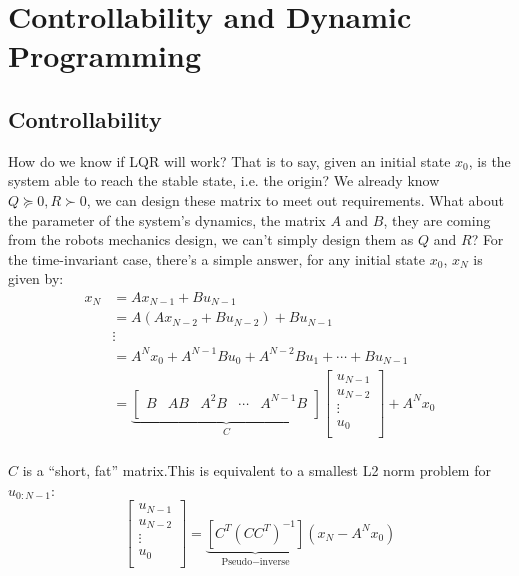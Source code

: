 \section{Controllability and Dynamic Programming}
\subsection{Controllability}
How do we know if LQR will work? That is to say, given an initial state $x_0$, is the system able to reach the stable state, i.e. the origin? We already know $Q\succeq 0,R\succ 0$, we can design these matrix to meet out requirements. What about the parameter of the system's dynamics, the matrix $A$ and $B$, they are coming from the robots mechanics design, we can't simply design them as $Q$ and $R$? For the time-invariant case, there's a simple answer, for any initial state $x_0$, $x_N$ is given by:
\begin{equation}
    \begin{array}{rl}
        x_N&		=Ax_{N-1}+Bu_{N-1}\\
        &		=A\left( Ax_{N-2}+Bu_{N-2} \right) +Bu_{N-1}\\
        &		\vdots\\
        &		=A^Nx_0+A^{N-1}Bu_0+A^{N-2}Bu_1+\cdots +Bu_{N-1}\\
        &		=\underset{C}{\underbrace{\left[ \begin{matrix}
        B&		AB&		A^2B&		\cdots&		A^{N-1}B\\
    \end{matrix} \right] }}\left[ \begin{array}{c}
        u_{N-1}\\
        u_{N-2}\\
        \vdots\\
        u_0\\
    \end{array} \right] +A^Nx_0\\
    \end{array}
\end{equation}

$C$ is a ``short, fat'' matrix.This is equivalent to a smallest L2 norm problem for $u_{0:N-1}$:
\begin{equation}
    \left[ \begin{array}{c}
        u_{N-1}\\
        u_{N-2}\\
        \vdots\\
        u_0\\
    \end{array} \right] =\underset{\text{Pseudo}-\text{inverse}}{\underbrace{\left[ C^T\left( CC^T \right) ^{-1} \right] }}\left( x_N-A^Nx_0 \right) 
\end{equation}

